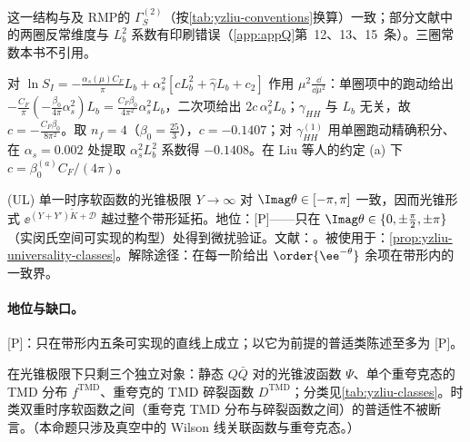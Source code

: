 这一结构与\cite[式~(A.6)]{Ji:2023pba}及 RMP\cite{JiEtAl2021}的 $\Gamma_S^{(2)}$（按\cref{tab:yzliu-conventions}换算）一致；部分文献中的两圈反常维度与 $L_b^2$ 系数有印刷错误（\cref{app:appQ}第~12、13、15~条）。三圈常数本书不引用。

\begin{example}\label{ex:yzliu-sI-rge}
对 $\ln S_I=-\frac{\alpha_s(\mu)C_F}{\pi}L_b+\alpha_s^2[cL_b^2+\hat\gamma L_b+c_2]$ 作用 $\mu^2\frac{\dd}{\dd\mu^2}$：单圈项中的跑动给出 $-\frac{C_F}{\pi}(-\frac{\beta_0}{4\pi}\alpha_s^2)L_b=\frac{C_F\beta_0}{4\pi^2}\alpha_s^2L_b$，二次项给出 $2c\,\alpha_s^2L_b$；$\gamma_{HH}$ 与 $L_b$ 无关，故 $c=-\frac{C_F\beta_0}{8\pi^2}$。取 $n_f=4$（$\beta_0=\frac{25}{3}$），$c=-0.1407$；对 $\gamma^{(1)}_{HH}$ 用单圈跑动精确积分、在 $\alpha_s=0.002$ 处提取 $\alpha_s^2L_b^2$ 系数得 $-0.1408$。在 Liu 等人的约定 (a) 下 $c=\beta_0^{(a)}C_F/(4\pi)$。
\end{example}

\begin{assumption}\label{asm:yzliu-lightcone-uniform}
(UL) 单一时序软函数的光锥极限 $Y\to\infty$ 对 $\Imag\theta\in[-\pi,\pi]$ 一致，因而光锥形式 $\ee^{(Y+Y')\tilde K+\mathcal D}$ 越过整个带形延拓。地位：[P]——只在 $\Imag\theta\in\{0,\pm\frac\pi2,\pm\pi\}$（实闵氏空间可实现的构型）处得到微扰验证。文献：\cite[第~4.5--4.7~节、第~6~节]{Liu:2022nnk}。被使用于：\cref{prop:yzliu-universality-classes}。解除途径：在每一阶给出 $\order{\ee^{-\theta}}$ 余项在带形内的一致界。
\end{assumption}

\paragraph{地位与缺口。}[P]：只在带形内五条可实现的直线上成立；以它为前提的普适类陈述至多为 [P]。

\begin{proposition}\label{prop:yzliu-universality-classes}
在光锥极限下只剩三个独立对象：静态 $Q\bar Q$ 对的光锥波函数 $\Psi$、单个重夸克态的 TMD 分布 $f^{\mathrm{TMD}}$、重夸克的 TMD 碎裂函数 $D^{\mathrm{TMD}}$；分类见\cref{tab:yzliu-classes}。时类双重时序软函数之间（重夸克 TMD 分布与碎裂函数之间）的普适性不被断言。（本命题只涉及真空中的 Wilson 线关联函数与重夸克态。）
\end{proposition}

